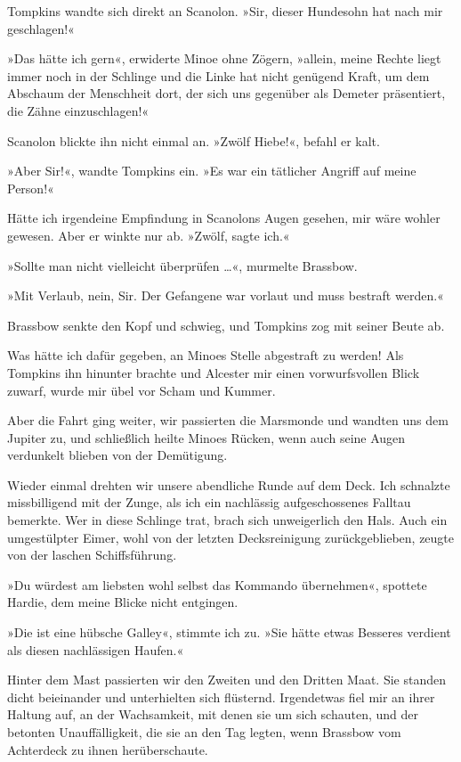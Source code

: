 Tompkins wandte sich direkt an Scanolon. »Sir, dieser Hundesohn hat
nach mir geschlagen!«

»Das hätte ich gern«, erwiderte Minoe ohne Zögern, »allein, meine
Rechte liegt immer noch in der Schlinge und die Linke hat nicht
genügend Kraft, um dem Abschaum der Menschheit dort, der sich uns
gegenüber als Demeter präsentiert, die Zähne einzuschlagen!«

Scanolon blickte ihn nicht einmal an. »Zwölf Hiebe!«, befahl er
kalt.

»Aber Sir!«, wandte Tompkins ein. »Es war ein tätlicher Angriff auf
meine Person!«

Hätte ich irgendeine Empfindung in Scanolons Augen gesehen, mir
wäre wohler gewesen. Aber er winkte nur ab. »Zwölf, sagte ich.«

»Sollte man nicht vielleicht überprüfen \ldots{}«, murmelte Brassbow.

»Mit Verlaub, nein, Sir. Der Gefangene war vorlaut und muss
bestraft werden.«

Brassbow senkte den Kopf und schwieg, und Tompkins zog mit seiner
Beute ab.

Was hätte ich dafür gegeben, an Minoes Stelle abgestraft zu werden!
Als Tompkins ihn hinunter brachte und Alcester mir einen
vorwurfsvollen Blick zuwarf, wurde mir übel vor Scham und Kummer.

Aber die Fahrt ging weiter, wir passierten die Marsmonde und
wandten uns dem Jupiter zu, und schließlich heilte Minoes Rücken,
wenn auch seine Augen verdunkelt blieben von der Demütigung.

\bigpar

Wieder einmal drehten wir unsere abendliche Runde auf dem Deck. Ich
schnalzte missbilligend mit der Zunge, als ich ein nachlässig
aufgeschossenes Falltau bemerkte. Wer in diese Schlinge trat, brach
sich unweigerlich den Hals. Auch ein umgestülpter Eimer, wohl von
der letzten Decksreinigung zurückgeblieben, zeugte von der laschen
Schiffsführung.

»Du würdest am liebsten wohl selbst das Kommando übernehmen«,
spottete Hardie, dem meine Blicke nicht entgingen.

»Die  ist eine hübsche Galley«, stimmte ich zu.
»Sie hätte etwas Besseres verdient als diesen nachlässigen
Haufen.«

Hinter dem Mast passierten wir den Zweiten und den Dritten Maat.
Sie standen dicht beieinander und unterhielten sich flüsternd.
Irgendetwas fiel mir an ihrer Haltung auf, an der Wachsamkeit, mit
denen sie um sich schauten, und der betonten Unauffälligkeit, die
sie an den Tag legten, wenn Brassbow vom Achterdeck zu ihnen
herüberschaute.

